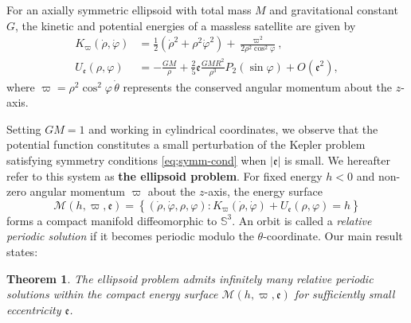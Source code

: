 \documentclass[11pt]{amsart}
\newcommand{\om}{\varpi}
\newcommand{\fe}{\mathfrak{e}}
\newtheorem{thm}{Theorem}[section]
\begin{document}
For an axially symmetric ellipsoid with total mass $M$ and gravitational constant $G$, the kinetic and potential energies of a massless satellite are given by
\begin{equation} \label{eq;ell-U}
	\begin{aligned}
		K_\om(\dot{\rho},\dot{\varphi}) &= \frac{1}{2}\left(\dot{\rho}^2 + \rho^2\dot{\varphi}^2\right) + \frac{\om^{2}}{2\rho^{2}\cos^{2}\varphi}, \\			  
		U_\fe(\rho,\varphi) &= -\frac{GM}{\rho} + \frac{2}{5}\fe\frac{GMR^{2}}{\rho^{3}}P_2(\sin\varphi) + O(\fe^{2}),
	\end{aligned}
\end{equation}
where $\om = \rho^2\cos^2\varphi\,\dot{\theta}$ represents the conserved angular momentum about the $z$-axis.

Setting $GM=1$ and working in cylindrical coordinates, we observe that the potential function constitutes a small perturbation of the Kepler problem satisfying symmetry conditions \eqref{eq;symm-cond} when $|\fe|$ is small. We hereafter refer to this system as \textbf{the ellipsoid problem}. For fixed energy $h<0$ and non-zero angular momentum $\om$ about the $z$-axis, the energy surface
\begin{equation*}
	\mathcal{M}(h,\om,\fe) = \left\{(\dot{\rho},\dot{\varphi},\rho,\varphi): K_\om(\dot{\rho},\dot{\varphi}) + U_\fe(\rho,\varphi) = h\right\}
\end{equation*}
forms a compact manifold diffeomorphic to $\mathbb{S}^{3}$. An orbit is called a \textit{relative periodic solution} if it becomes periodic modulo the $\theta$-coordinate. Our main result states:
\begin{thm}\label{thm:axial symmetry ellipsoid potential}
	The ellipsoid problem admits infinitely many relative periodic solutions within the compact energy surface $\mathcal{M}(h,\om,\fe)$ for sufficiently small eccentricity $\fe$.
\end{thm}
\end{document}
